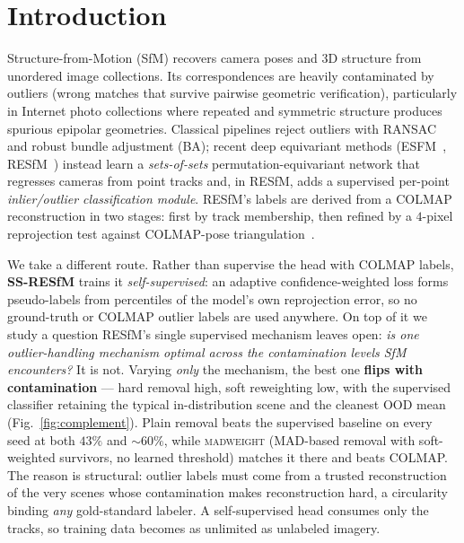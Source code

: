 \documentclass[10pt,twocolumn,letterpaper]{article}
\newcommand{\mad}{\textsc{madweight}}
\begin{document}
\begin{abstract}
retains the in-distribution regime and the cleanest OOD mean (self-supervised arms within
$\sim\!38\%$ in distribution). Every comparison is backed by five-training-seed bands, a
paired-seed evaluation control, and an environment-noise study --- in a benchmark family
where prior work fixes a single seed. We trace this to a structural circularity: outlier labels
require a trusted reconstruction of the very scenes whose contamination makes
reconstruction hard (for \emph{any} gold-standard labeler, not just COLMAP), and we
measure the resulting \emph{label ceiling}: regenerating supervision from scratch, label
recall collapses from $0.82$ to $\sim\!0.3$ above $\sim\!15\%$ contamination, precisely
where robustness is needed. Label-free adaptivity is thus a missing ingredient for robust
deep SfM.
\end{abstract}
\section{Introduction}
Structure-from-Motion (SfM) recovers camera poses and 3D structure from unordered image
collections. Its correspondences are heavily contaminated by outliers (wrong matches
that survive pairwise geometric verification), particularly in Internet photo collections
where repeated and symmetric structure produces spurious epipolar geometries. Classical
pipelines reject outliers with RANSAC and robust bundle adjustment (BA); recent deep
equivariant methods (ESFM~\citep{esfm}, RESfM~\citep{resfm}) instead learn a
\emph{sets-of-sets} permutation-equivariant network that regresses cameras from point
tracks and, in RESfM, adds a supervised per-point \emph{inlier/outlier classification
module}. RESfM's labels are derived from a COLMAP~\citep{colmap} reconstruction in two
stages: first by track membership, then refined by a $4$-pixel reprojection test against
COLMAP-pose triangulation~\citep{resfm}.

We take a different route. Rather than supervise the head with COLMAP labels,
\textbf{SS-RESfM} trains it \emph{self-supervised}: an adaptive confidence-weighted loss
forms pseudo-labels from percentiles of the model's own reprojection error, so no
ground-truth or COLMAP outlier labels are used anywhere. On top of it we study a question
RESfM's single supervised mechanism leaves open: \emph{is one outlier-handling mechanism
optimal across the contamination levels SfM encounters?} It is not. Varying \emph{only}
the mechanism, the best one \textbf{flips with contamination} --- hard removal high, soft
reweighting low, with the supervised classifier retaining the typical in-distribution
scene and the cleanest OOD mean (Fig.~\ref{fig:complement}). Plain removal beats the
supervised baseline on every seed at both $43\%$ and $\sim\!60\%$, while \mad{} (MAD-based
removal with soft-weighted survivors, no learned threshold) matches it there and beats
COLMAP. The reason is structural: outlier labels must come from a trusted reconstruction
of the very scenes whose contamination makes reconstruction hard, a circularity binding
\emph{any} gold-standard labeler. A self-supervised head consumes only the tracks, so
training data becomes as unlimited as unlabeled imagery.
\end{document}
